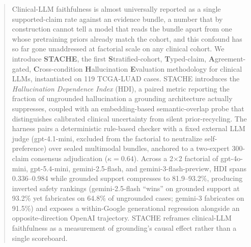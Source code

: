 \documentclass{article}
\theoremstyle{plain}
\begin{document}

\printAffiliationsAndNotice{}

\begin{abstract}
Clinical-LLM faithfulness is almost universally reported as a single supported-claim rate against an evidence bundle, a number that by construction cannot tell a model that reads the bundle apart from one whose pretraining priors already match the cohort, and this confound has so far gone unaddressed at factorial scale on any clinical cohort. We introduce \textbf{STACHE}, the first \textbf{S}tratified-cohort, \textbf{T}yped-claim, \textbf{A}greement-gated, \textbf{C}ross-condition \textbf{H}allucination \textbf{E}valuation methodology for clinical LLMs, instantiated on 119 TCGA-LUAD cases. STACHE introduces the \emph{Hallucination Dependence Index} (HDI), a paired metric reporting the fraction of ungrounded hallucination a grounding architecture actually suppresses, coupled with an embedding-based semantic-overlap probe that distinguishes calibrated clinical uncertainty from silent prior-recycling. The harness pairs a deterministic rule-based checker with a fixed external LLM judge (gpt-4.1-mini, excluded from the factorial to neutralize self-preference) over sealed multimodal bundles, anchored to a two-expert 300-claim consensus adjudication ($\kappa{=}0.64$). Across a 2$\times$2 factorial of gpt-4o-mini, gpt-5.4-mini, gemini-2.5-flash, and gemini-3-flash-preview, HDI spans 0.336--0.984 while grounded support compresses to 81.9--93.2\%, producing inverted safety rankings (gemini-2.5-flash ``wins'' on grounded support at 93.2\% yet fabricates on 64.8\% of ungrounded cases; gemini-3 fabricates on 91.5\%) and exposes a within-Google generational regression alongside an opposite-direction OpenAI trajectory. STACHE reframes clinical-LLM faithfulness as a measurement of grounding's causal effect rather than a single scoreboard.
\end{abstract}
\end{document}
